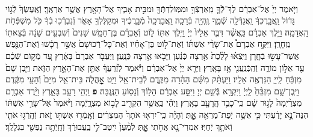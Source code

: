 \documentclass[twoside, openany, parskip=half, 11pt]{book}
\begin{document}
\begin{sometimes}
\begin{footnotesize}
\begin{multicols}{2}
\\
וַיֹּ֤אמֶר יְיָ֙ אֶל־אַבְרָ֔ם לֶךְ־לְֿֿךָ֛ מֵֽאַרְצְֿךָ֥ וּמִמּֽוֹלַדְתְּֿךָ֖ וּמִבֵּ֣ית אָבִ֑יךָ אֶל־הָאָ֖רֶץ אֲשֶׁ֥ר אַרְאֶֽךָּ׃ וְֿאֶֽעֶשְׂךָ֙ לְֿג֣וֹי גָּד֔וֹל וַֽאֲבָ֣רֶכְךָ֔ וַֽאֲגַדְּֿלָ֖ה שְֿׁמֶ֑ךָ וֶֽהְיֵ֖ה בְּֿרָכָֽה׃ וַֽאֲבָרֲכָֽה֙ מְֿבָ֣רֲכֶ֔יךָ וּמְקַלֶּלְךָ֖ אָאֹ֑ר וְֿנִבְרְֿכ֣וּ בְֿךָ֔ כֹּ֖ל מִשְׁפְּֿחֹ֥ת הָֽאֲדָמָֽה׃  וַיֵּ֣לֶךְ אַבְרָ֗ם כַּֽאֲשֶׁ֨ר דִּבֶּ֤ר אֵלָיו֙ יְיָ֔ וַיֵּ֥לֶךְ אִתּ֖וֹ ל֑וֹט וְֿאַבְרָ֗ם בֶּן־חָמֵ֤שׁ שָׁנִים֙ וְֿשִׁבְעִ֣ים שָׁנָ֔ה בְּֿצֵאת֖וֹ מֵֽחָרָֽן׃ וַיִּקַּ֣ח אַבְרָם֩ אֶת־שָׂרַ֨י אִשְׁתּ֜וֹ וְֿאֶת־ל֣וֹט בֶּן־אָחִ֗יו וְֿאֶת־כׇּל־רְֿכוּשָׁם֙ אֲשֶׁ֣ר רָכָ֔שׁוּ וְֿאֶת־הַנֶּ֖פֶשׁ אֲשֶׁר־עָשׂ֣וּ בְֿחָ֑רָן וַיֵּֽצְֿא֗וּ לָלֶ֨כֶת֙ אַ֣רְצָה כְּֿנַ֔עַן וַיָּבֹ֖אוּ אַ֥רְצָה כְּֿנָֽעַן׃ וַיַּעֲבֹ֤ר אַבְרָם֙ בָּאָ֔רֶץ עַ֚ד מְֿק֣וֹם שְֿׁכֶ֔ם עַ֖ד אֵל֣וֹן מוֹרֶ֑ה וְֿהַֽכְּֿנַֽעֲנִ֖י אָ֥ז בָּאָֽרֶץ׃ וַיֵּרָ֤א יְיָ֙ אֶל־אַבְרָ֔ם וַיֹּ֕אמֶר לְֿזַ֨רְעֲךָ֔ אֶתֵּ֖ן אֶת־הָאָ֣רֶץ הַזֹּ֑את וַיִּ֤בֶן שָׁם֙ מִזְבֵּ֔חַ לַֽייָ֖ הַנִּרְאֶ֥ה אֵלָֽיו׃ וַיַּעְתֵּ֨ק מִשָּׁ֜ם הָהָ֗רָה מִקֶּ֛דֶם לְֿבֵית־אֵ֖ל וַיֵּ֣ט אׇׇׇׇׇׇׇׇׇׇׇׇָֽהֳלֹ֑ה בֵּית־אֵ֤ל מִיָּם֙ וְֿהָעַ֣י מִקֶּ֔דֶם וַיִּֽבֶן־שָׁ֤ם מִזְבֵּ֨חַ֙ לַֽיְיָ֔ וַיִּקְרָ֖א בְּֿשֵׁ֥ם יְיָ׃ וַיִּסַּ֣ע אַבְרָ֔ם הָל֥וֹךְ וְֿנָס֖וֹעַ הַנֶּֽגְבָּה׃ \textbf{פ}
 וַיְהִ֥י רָעָ֖ב בָּאָ֑רֶץ וַיֵּ֨רֶד אַבְרָ֤ם מִצְרַ֨יְמָה֙ לָג֣וּר שָׁ֔ם כִּֽי־כָבֵ֥ד הָֽרָעָ֖ב בָּאָֽרֶץ׃ וַיְהִ֕י כַּֽאֲשֶׁ֥ר הִקְרִ֖יב לָב֣וֹא מִצְרָ֑יְֿמָה וַיֹּ֨אמֶר֙ אֶל־שָׂרַ֣י אִשְׁתּ֔וֹ הִנֵּה־נָ֣א יָדַ֔עְתִּי כִּ֛י אִשָּׁ֥ה יְֿפַת־מַרְאֶ֖ה אׇׇׇׇׇׇָֽתְּ׃ וְֿהָיָ֗ה כִּֽי־יִרְא֤וּ אֹתָךְ֙ הַמִּצְרִ֔ים וְֿאָֽמְֿר֖וּ אִשְׁתּ֣וֹ זֹ֑את וְֿהָֽרְֿג֥וּ אֹתִ֖י וְֿאֹתָ֥ךְ יְֿחַיּֽוּ׃ אִמְרִי־נָ֖א אֲחֹ֣תִי אׇׇׇׇָ֑תְּ לְֿמַ֨עַן֙ יִֽיטַב־לִ֣י בַֽעֲבוּרֵ֔ךְ וְֿחָֽיְֿתָ֥ה נַפְשִׁ֖י בִּגְלָלֵֽךְ׃


\end{multicols}
\end{footnotesize}
\end{sometimes}
\end{document}
